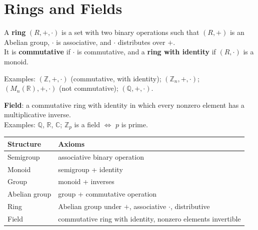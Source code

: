 \documentclass[12pt, a4paper, UTF8, openany]{ctexbook}
\newcommand{\field}[1]{\mathbb{#1}}%
\begin{document}
    \section{Rings and Fields}
        A \textbf{ring} $(R, +, \cdot)$ is a set with two binary operations such that $(R, +)$ is an Abelian group, $\cdot$ is associative, and $\cdot$ distributes over $+$. \\
        It is \textbf{commutative} if $\cdot$ is commutative, and a \textbf{ring with identity} if $(R, \cdot)$ is a monoid.

        Examples: $(\field{Z}, +, \cdot)$ (commutative, with identity); $(\field{Z}_n, +, \cdot)$; \\
        $(M_n(\field{R}), +, \cdot)$ (not commutative); $(\field{Q}, +, \cdot)$.

        \textbf{Field}: a commutative ring with identity in which every nonzero element has a multiplicative inverse. \\
        Examples: $\field{Q}$, $\field{R}$, $\field{C}$; $\field{Z}_p$ is a field $\iff$ $p$ is prime.

        \begin{longtable}[h]{l l}
            \toprule
            Structure & Axioms \\
            \midrule
            Semigroup & associative binary operation \\
            Monoid & semigroup + identity \\
            Group & monoid + inverses \\
            Abelian group & group + commutative operation \\
            Ring & Abelian group under $+$, associative $\cdot$, distributive \\
            Field & commutative ring with identity, nonzero elements invertible \\
            \bottomrule
        \end{longtable}
\end{document}
